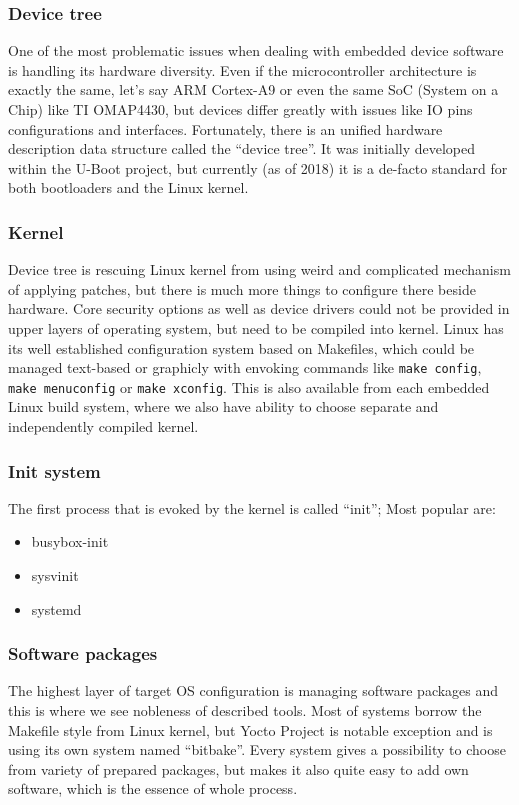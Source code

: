 \documentclass[printmode]{mgr}
\begin{document}
\subsubsection{Device tree}
One of the most problematic issues when dealing with embedded device software is handling its hardware diversity. Even if the microcontroller architecture is exactly the same, let's say ARM Cortex-A9 or even the same SoC (System on a Chip) like TI OMAP4430, but devices differ greatly with issues like IO pins configurations and interfaces. Fortunately, there is an unified hardware description data structure called the ``device tree''. It was initially developed within the U-Boot project, but currently (as of 2018) it is a de-facto standard for both bootloaders and the Linux kernel.

\subsubsection{Kernel}
Device tree is rescuing Linux kernel from using weird and complicated mechanism of applying patches, but there is much more things to configure there beside hardware. Core security options as well as device drivers could not be provided in upper layers of operating system, but need to be compiled into kernel. Linux has its well established configuration system based on Makefiles, which could be managed text-based or graphicly with envoking commands like \verb|make config|, \verb|make menuconfig| or \verb|make xconfig|. This is also available from each embedded Linux build system, where we also have ability to choose separate and independently compiled kernel.

\subsubsection{Init system}

The first process that is evoked by the kernel is called ``init''; Most popular are:

\begin{itemize}
    \item busybox-init
    \item sysvinit
    \item systemd
\end{itemize}

\subsubsection{Software packages}
The highest layer of target OS configuration is managing software packages and this is where we see nobleness of described tools. Most of systems borrow the Makefile style from Linux kernel, but Yocto Project is notable exception and is using its own system named ``bitbake''. Every system gives a possibility to choose from variety of prepared packages, but makes it also quite easy to add own software, which is the essence of whole process.
\end{document}
